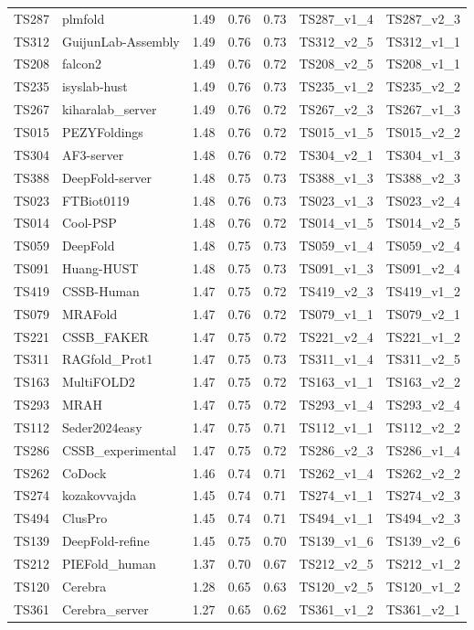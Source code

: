 \begin{table}[ht]
{\begin{tabular}{llrrrll}
TS287 & plmfold & 1.49 & 0.76 & 0.73 & TS287\_v1\_4 & TS287\_v2\_3 \\ 
TS312 & GuijunLab-Assembly & 1.49 & 0.76 & 0.73 & TS312\_v2\_5 & TS312\_v1\_1 \\ 
TS208 & falcon2 & 1.49 & 0.76 & 0.72 & TS208\_v2\_5 & TS208\_v1\_1 \\ 
TS235 & isyslab-hust & 1.49 & 0.76 & 0.73 & TS235\_v1\_2 & TS235\_v2\_2 \\ 
TS267 & kiharalab\_server & 1.49 & 0.76 & 0.72 & TS267\_v2\_3 & TS267\_v1\_3 \\ 
TS015 & PEZYFoldings & 1.48 & 0.76 & 0.72 & TS015\_v1\_5 & TS015\_v2\_2 \\ 
TS304 & AF3-server & 1.48 & 0.76 & 0.72 & TS304\_v2\_1 & TS304\_v1\_3 \\ 
TS388 & DeepFold-server & 1.48 & 0.75 & 0.73 & TS388\_v1\_3 & TS388\_v2\_3 \\ 
TS023 & FTBiot0119 & 1.48 & 0.76 & 0.73 & TS023\_v1\_3 & TS023\_v2\_4 \\ 
TS014 & Cool-PSP & 1.48 & 0.76 & 0.72 & TS014\_v1\_5 & TS014\_v2\_5 \\ 
TS059 & DeepFold & 1.48 & 0.75 & 0.73 & TS059\_v1\_4 & TS059\_v2\_4 \\ 
TS091 & Huang-HUST & 1.48 & 0.75 & 0.73 & TS091\_v1\_3 & TS091\_v2\_4 \\ 
TS419 & CSSB-Human & 1.47 & 0.75 & 0.72 & TS419\_v2\_3 & TS419\_v1\_2 \\ 
TS079 & MRAFold & 1.47 & 0.76 & 0.72 & TS079\_v1\_1 & TS079\_v2\_1 \\ 
TS221 & CSSB\_FAKER & 1.47 & 0.75 & 0.72 & TS221\_v2\_4 & TS221\_v1\_2 \\ 
TS311 & RAGfold\_Prot1 & 1.47 & 0.75 & 0.73 & TS311\_v1\_4 & TS311\_v2\_5 \\ 
TS163 & MultiFOLD2 & 1.47 & 0.75 & 0.72 & TS163\_v1\_1 & TS163\_v2\_2 \\ 
TS293 & MRAH & 1.47 & 0.75 & 0.72 & TS293\_v1\_4 & TS293\_v2\_4 \\ 
TS112 & Seder2024easy & 1.47 & 0.75 & 0.71 & TS112\_v1\_1 & TS112\_v2\_2 \\ 
TS286 & CSSB\_experimental & 1.47 & 0.75 & 0.72 & TS286\_v2\_3 & TS286\_v1\_4 \\ 
TS262 & CoDock & 1.46 & 0.74 & 0.71 & TS262\_v1\_4 & TS262\_v2\_2 \\ 
TS274 & kozakovvajda & 1.45 & 0.74 & 0.71 & TS274\_v1\_1 & TS274\_v2\_3 \\ 
TS494 & ClusPro & 1.45 & 0.74 & 0.71 & TS494\_v1\_1 & TS494\_v2\_3 \\ 
TS139 & DeepFold-refine & 1.45 & 0.75 & 0.70 & TS139\_v1\_6 & TS139\_v2\_6 \\ 
TS212 & PIEFold\_human & 1.37 & 0.70 & 0.67 & TS212\_v2\_5 & TS212\_v1\_2 \\ 
TS120 & Cerebra & 1.28 & 0.65 & 0.63 & TS120\_v2\_5 & TS120\_v1\_2 \\ 
TS361 & Cerebra\_server & 1.27 & 0.65 & 0.62 & TS361\_v1\_2 & TS361\_v2\_1 \\ 
\bottomrule
\end{tabular}%
}
\end{table}
